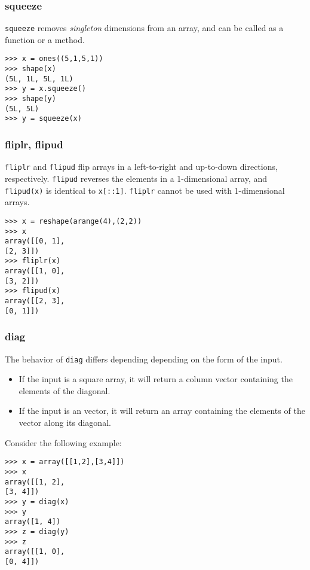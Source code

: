 \documentclass[KSmain.tex]{subfiles}
\begin{document}
\subsubsection{squeeze}
\texttt{squeeze} removes \textit{singleton} dimensions from an array, and can be called as a function or a method.
\begin{framed}
\begin{verbatim}
>>> x = ones((5,1,5,1))
>>> shape(x)
(5L, 1L, 5L, 1L)
>>> y = x.squeeze()
>>> shape(y)
(5L, 5L)
>>> y = squeeze(x)
\end{verbatim}
\end{framed}
\subsubsection{fliplr, flipud}
\texttt{fliplr} and \texttt{flipud} flip arrays in a left-to-right and up-to-down directions, respectively. \texttt{flipud} reverses
the elements in a 1-dimensional array, and \texttt{flipud(x)} is identical to \texttt{x[::1]}.
\texttt{fliplr} cannot be used with 1-dimensional arrays.
\begin{framed}
\begin{verbatim}
>>> x = reshape(arange(4),(2,2))
>>> x
array([[0, 1],
[2, 3]])
>>> fliplr(x)
array([[1, 0],
[3, 2]])
>>> flipud(x)
array([[2, 3],
[0, 1]])
\end{verbatim}
\end{framed}
\subsubsection{diag}
The behavior of \texttt{diag} differs depending depending on the form of the input. 
\begin{itemize}
\item If the input is a square array, it
will return a column vector containing the elements of the diagonal. 
\item If the input is an vector, it will return
an array containing the elements of the vector along its diagonal. 
\end{itemize}

Consider the following example:
\begin{framed}
\begin{verbatim}
>>> x = array([[1,2],[3,4]])
>>> x
array([[1, 2],
[3, 4]])
>>> y = diag(x)
>>> y
array([1, 4])
>>> z = diag(y)
>>> z
array([[1, 0],
[0, 4]])
\end{verbatim}
\end{framed}
\end{document}
